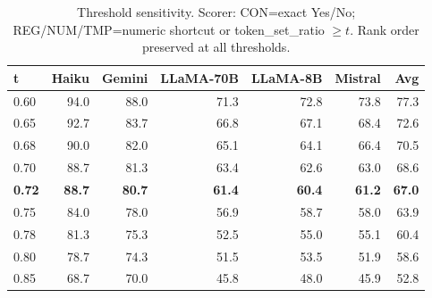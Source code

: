 \begin{table}[ht]
\centering
\small
\caption{Threshold sensitivity. Scorer: CON=exact Yes/No; REG/NUM/TMP=numeric shortcut or token\_set\_ratio $\geq t$. Rank order preserved at all thresholds.}
\label{tab:fuzzy-ablation}
\begin{tabular}{lrrrrrr}
\toprule
\textbf{t} & \textbf{Haiku} & \textbf{Gemini} & \textbf{LLaMA-70B} & \textbf{LLaMA-8B} & \textbf{Mistral} & \textbf{Avg} \\
\midrule
0.60 & 94.0 & 88.0 & 71.3 & 72.8 & 73.8 & 77.3 \\
0.65 & 92.7 & 83.7 & 66.8 & 67.1 & 68.4 & 72.6 \\
0.68 & 90.0 & 82.0 & 65.1 & 64.1 & 66.4 & 70.5 \\
0.70 & 88.7 & 81.3 & 63.4 & 62.6 & 63.0 & 68.6 \\
\textbf{0.72} & \textbf{88.7} & \textbf{80.7} & \textbf{61.4} & \textbf{60.4} & \textbf{61.2} & \textbf{67.0} \\
0.75 & 84.0 & 78.0 & 56.9 & 58.7 & 58.0 & 63.9 \\
0.78 & 81.3 & 75.3 & 52.5 & 55.0 & 55.1 & 60.4 \\
0.80 & 78.7 & 74.3 & 51.5 & 53.5 & 51.9 & 58.6 \\
0.85 & 68.7 & 70.0 & 45.8 & 48.0 & 45.9 & 52.8 \\
\bottomrule
\end{tabular}
\end{table}
